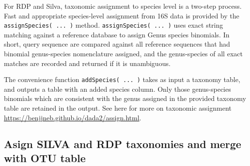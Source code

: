 \documentclass[
]{article}
\begin{document}
For RDP and Silva, taxonomic assignment to species level is a two-step
process. Fast and appropriate species-level assignment from 16S data is
provided by the \texttt{assignSpecies(\ ...\ )} method.
\texttt{assignSpecies(\ ...\ )} uses exact string matching against a
reference database to assign Genus species binomials. In short, query
sequence are compared against all reference sequences that had binomial
genus-species nomenclature assigned, and the genus-species of all exact
matches are recorded and returned if it is unambiguous.

The convenience function \texttt{addSpecies(\ ...\ )} takes as input a
taxonomy table, and outputs a table with an added species column. Only
those genus-species binomials which are consistent with the genus
assigned in the provided taxonomy table are retained in the output. See
here for more on taxonomic assignment
\url{https://benjjneb.github.io/dada2/assign.html}.

\hypertarget{asign-silva-and-rdp-taxonomies-and-merge-with-otu-table}{%
\subsection{Asign SILVA and RDP taxonomies and merge with OTU
table}\label{asign-silva-and-rdp-taxonomies-and-merge-with-otu-table}}
\end{document}
